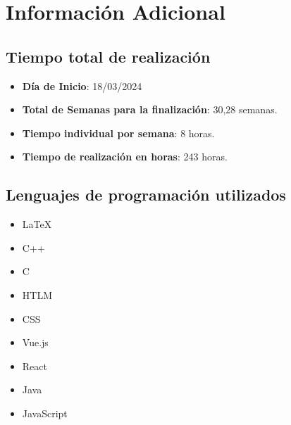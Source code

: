         \section{Información Adicional}
            \subsection{Tiempo total de realización}
                \begin{itemize} [label=•]
                    \setlength{\itemindent}{2.5em}
                        \item \textbf{Día de Inicio}: 18/03/2024
                        \item \textbf{Total de Semanas para la finalización}: 30,28 semanas.
                        \item \textbf{Tiempo individual por semana}: 8 horas.
                        \item \textbf{Tiempo de realización en horas}: 243 horas.
                \end{itemize}
                
            \subsection{Lenguajes de programación utilizados}
                \begin{itemize} [label=•]
                    \setlength{\itemindent}{2.5em}
                        \item \LaTeX
                        \item C++
                        \item C
                        \item HTLM
                        \item CSS
                        \item Vue.js
                        \item React
                        \item Java
                        \item JavaScript
                \end{itemize}
                
